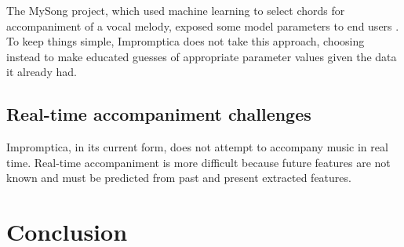 \documentclass[11pt,conference,letterpaper]{IEEEtran}
\begin{document}
The MySong project, which used machine learning to select chords for accompaniment of a vocal melody, exposed some model parameters to end users \cite{morris2008exposing}. To keep things simple, Impromptica does not take this approach, choosing instead to make educated guesses of appropriate parameter values given the data it already had.


\subsection{Real-time accompaniment challenges}

Impromptica, in its current form, does not attempt to accompany music in real time. Real-time accompaniment is more difficult because future features are not known and must be predicted from past and present extracted features.


\section{Conclusion}



\end{document}

